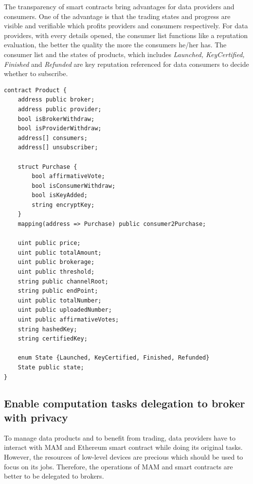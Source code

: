\documentclass[conference]{IEEEtran}
\begin{document}
The transparency of smart contracts bring advantages for data providers and consumers. One of the advantage is that the trading states and progress are visible and verifiable which profits providers and consumers respectively. For data providers, with every details opened, the consumer list functions like a reputation evaluation, the better the quality the more the consumers he/her has. The consumer list and the states of products, which includes \textit{Launched, KeyCertified, Finished} and \textit{Refunded} are key reputation referenced for data consumers to decide whether to subscribe. 

\lstset{style=solidity}
\begin{lstlisting}[caption={Product Contract data fields}, label={lst:constructor}, frame=single]
contract Product {
    address public broker;
    address public provider;
    bool isBrokerWithdraw;
    bool isProviderWithdraw;
    address[] consumers;
    address[] unsubscriber;
    
    struct Purchase {
        bool affirmativeVote;
        bool isConsumerWithdraw;
        bool isKeyAdded;
        string encryptKey;
    }
    mapping(address => Purchase) public consumer2Purchase;
    
    uint public price;
    uint public totalAmount;
    uint public brokerage;
    uint public threshold;
    string public channelRoot;
    string public endPoint;
    uint public totalNumber;
    uint public uploadedNumber;
    uint public affirmativeVotes;
    string hashedKey;
    string certifiedKey;
    
    enum State {Launched, KeyCertified, Finished, Refunded}
    State public state;
}
\end{lstlisting}

\subsection{Enable computation tasks delegation to broker with privacy}
To manage data products and to benefit from trading, data providers have to interact with MAM and Ethereum smart contract while doing its original tasks. However, the resources of low-level devices are precious which should be used to focus on its jobs. Therefore, the operations of MAM and smart contracts are better to be delegated to brokers. 
\end{document}
